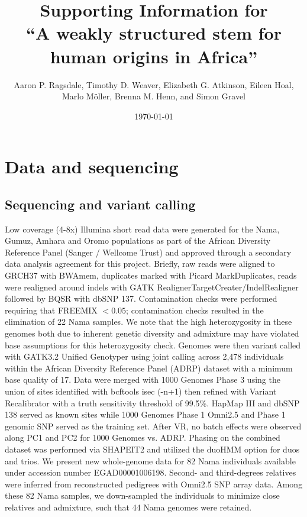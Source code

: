 \documentclass[]{article}
\begin{document}
\title{Supporting Information for\\
``A weakly structured stem for human origins in Africa''}
\author{Aaron P. Ragsdale, Timothy D. Weaver, Elizabeth G. Atkinson, Eileen Hoal, Marlo M\"{o}ller, Brenna M. Henn, and Simon Gravel}
\date{\normalsize \today}
\maketitle

\renewcommand{\thefigure}{S\arabic{figure}}
\renewcommand{\thetable}{S\arabic{table}}
\renewcommand{\theequation}{S\arabic{equation}}
\setcounter{figure}{0}
\setcounter{table}{0}
\setcounter{equation}{0}

\small
\tableofcontents
\normalsize

\section{Data and sequencing}

\subsection{Sequencing and variant calling}

Low coverage (4-8x) Illumina short read data were generated for the Nama,
Gumuz, Amhara and Oromo populations as part of the African Diversity Reference
Panel (Sanger / Wellcome Trust) \citep{Gurdasani2015-qy,Pagani2015-pz} and
approved through a secondary data analysis agreement for this project. Briefly,
raw reads were aligned to GRCH37 with BWAmem, duplicates
marked with Picard MarkDuplicates, reads were realigned around indels with GATK
RealignerTargetCreater/IndelRealigner followed by BQSR with dbSNP 137.
Contamination checks were performed requiring that FREEMIX $<0.05$;
contamination checks resulted in the elimination of 22 Nama samples. We note
that the high heterozygosity in these genomes both due to inherent genetic
diversity and admixture may have violated base assumptions for this
heterozygosity check. Genomes were then variant called with GATK3.2 Unified
Genotyper \citep{DePristo2011-up} using joint calling across 2,478 individuals within
the African Diversity Reference Panel (ADRP) dataset with a
minimum base quality of 17. Data were merged with 1000
Genomes Phase 3 \citep{1000_Genomes_Project_Consortium2015-zq} using the union
of sites identified with bcftools isec (-n+1) \citep{Danecek2021-kc} then refined
with Variant Recalibrator with a truth sensitivity threshold of 99.5\%. HapMap
III and dbSNP 138 served as known sites while 1000 Genomes Phase 1 Omni2.5 and
Phase 1 genomic SNP served as the training set. After VR, no batch effects were
observed along PC1 and PC2 for 1000 Genomes vs. ADRP. Phasing on the combined
dataset was performed via SHAPEIT2 \citep{Delaneau2013-aw} and utilized the duoHMM
option for duos and trios. We present new whole-genome data for 82 Nama individuals 
available under accession number EGAD00001006198.
Second- and third-degrees relatives were inferred from reconstructed
pedigrees with Omni2.5 SNP array data.
Among these 82 Nama samples, we down-sampled the individuals to minimize
close relatives and admixture, such that 44 Nama genomes were retained.
\end{document}
